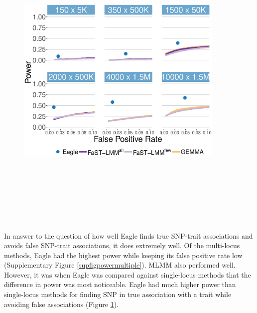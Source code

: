 \documentclass{article}
\begin{document}
\begin{figure}
\caption{
}
\vspace{-3cm}
\label{figpowersingle}
\includegraphics[width=10cm, height=15cm]{power2main.eps}

\end{figure}





In answer to the question of how well Eagle finds true SNP-trait associations and avoids false SNP-trait associations, it does extremely 
well.  Of the multi-locus methods, Eagle had the highest power
while keeping its false positive rate low (Supplementary Figure \ref{supfigpowermultiple}). MLMM also performed well. However, it was when Eagle was compared against single-locus methods 
that the difference in power was most noticeable.  Eagle had much higher power than single-locus methods for finding SNP in true 
association with a trait while avoiding false associations (Figure \ref{figpowersingle}). 
\end{document}
